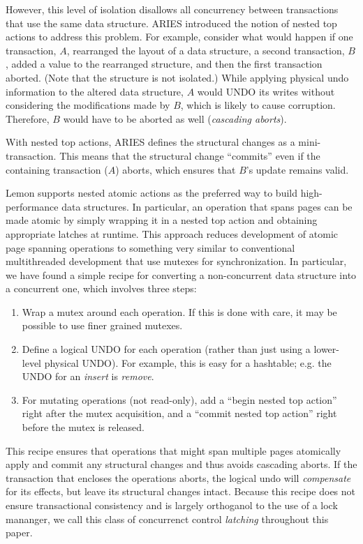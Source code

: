 \documentclass[10pt,letterpaper,twocolumn,english]{article}
\newcommand{\yad}{Lemon\xspace}
\begin{document}
However, this level of isolation disallows all concurrency between 
transactions that use the same data structure.  ARIES introduced the 
notion of nested top actions to
address this problem.  For example, consider what would happen if one
transaction, $A$, rearranged the layout of a data structure, a second
transaction, $B$, added a value to the rearranged structure, and then
the first transaction aborted.  (Note that the structure is not
isolated.)  While applying physical undo information to the altered
data structure,  $A$ would UNDO its writes
without considering the modifications made by
$B$, which is likely to cause corruption.  Therefore, $B$ would 
have to be aborted as well ({\em cascading aborts}).

With nested top actions, ARIES defines the structural changes as a
mini-transaction. This means that the structural change
``commits'' even if the containing transaction ($A$) aborts, which
ensures that $B$'s update remains valid.

\yad supports nested atomic actions as the preferred way to build
high-performance data structures. In particular, an operation that
spans pages can be made atomic by simply wrapping it in a nested top
action and obtaining appropriate latches at runtime.  This approach
reduces development of atomic page spanning operations to something
very similar to conventional multithreaded development that use mutexes
for synchronization.
In particular, we have found a simple recipe for converting a
non-concurrent data structure into a concurrent one, which involves
three steps:
\begin{enumerate}
\item Wrap a mutex around each operation.  If this is done with care,
  it may be possible to use finer grained mutexes.
\item Define a logical UNDO for each operation (rather than just using
  a lower-level physical UNDO).  For example, this is easy for a
  hashtable; e.g. the UNDO for an {\em insert} is {\em remove}.
\item For mutating operations (not read-only), add a ``begin nested
  top action'' right after the mutex acquisition, and a ``commit
  nested top action'' right before the mutex is released.
\end{enumerate}
This recipe ensures that operations that might span multiple pages
atomically apply and commit any structural changes and thus avoids 
cascading aborts.  If the transaction that encloses the operations
aborts, the logical undo will {\em compensate} for
its effects, but leave its structural changes intact. Because this 
recipe does not ensure transactional consistency and is largely 
orthoganol to the use of a lock mananger, we call this class of 
concurrenct control {\em latching} throughout this paper.
\end{document}
